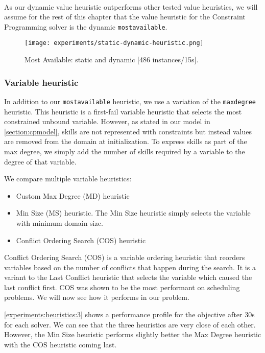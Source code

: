\documentclass[../../thesis.tex]{subfiles}
\begin{document}
\paragraph{}

As our dynamic value heuristic outperforms other tested value heuristics, we will assume for the rest of this chapter 
that the value heuristic for the Constraint Programming solver is the dynamic \texttt{mostavailable}.


\begin{figure}
  \centering
  \texttt{[image: experiments/static-dynamic-heuristic.png]}
  \caption{Most Available: static and dynamic [486 instances/15s].}
  \label{experiments:heuristic2}
\end{figure}


\subsubsection{Variable heuristic}

In addition to our \texttt{mostavailable} heuristic, we use a variation of the \texttt{maxdegree} heuristic. 
This heuristic is a first-fail variable heuristic that selects the most constrained unbound variable. However,
as stated in our model in \autoref{section:cpmodel}, skills are not represented with constraints but instead values 
are removed from the domain at initialization. To express skills as part of the max degree, we simply add the number of 
skills required by a variable to the degree of that variable.


We compare multiple variable heuristics:

\begin{itemize}
  \item Custom Max Degree (MD) heuristic
  \item Min Size (MS) heuristic. The Min Size heuristic simply selects the variable with minimum domain size.
  \item Conflict Ordering Search (COS) heuristic
\end{itemize}


Conflict Ordering Search (COS) \cite{Gay:COS} is a variable ordering heuristic that 
reorders variables based on the number of conflicts that happen during the search.
It is a variant to the Last Conflict heuristic that selects the variable which caused the last conflict first.
COS was shown to be the most performant on scheduling problems. We will now see how it performs in our problem.

\autoref{experiments:heuristics:3} shows a performance profile for the objective after 30s for each solver.
We can see that the three heuristics are very close of each other. However, the Min Size heuristic performs slightly better the Max Degree heuristic with the 
COS heuristic coming last.
\end{document}

